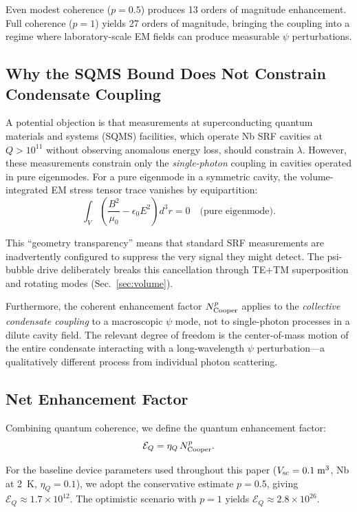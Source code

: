 \documentclass[twocolumn,prl,superscriptaddress,nofootinbib,longbibliography,floatfix]{revtex4-2}
\begin{document}
Even modest coherence ($p = 0.5$) produces 13 orders of magnitude
enhancement.  Full coherence ($p = 1$) yields 27 orders of magnitude,
bringing the coupling into a regime where laboratory-scale EM fields can
produce measurable $\psi$ perturbations.

\subsection{Why the SQMS Bound Does Not Constrain Condensate Coupling}

A potential objection is that measurements at superconducting quantum
materials and systems (SQMS) facilities, which operate Nb SRF cavities
at $Q > 10^{11}$ without observing anomalous energy loss, should
constrain $\lambda$.  However, these measurements constrain only the
\emph{single-photon} coupling in cavities operated in pure eigenmodes.
For a pure eigenmode in a symmetric cavity, the volume-integrated EM
stress tensor trace vanishes by equipartition:
\begin{equation}
\int_V \left(\frac{B^2}{\mu_0} - \epsilon_0 E^2\right) d^3r = 0
\quad \text{(pure eigenmode)}.
\label{eq:transparency}
\end{equation}

This ``geometry transparency'' means that standard SRF measurements are
inadvertently configured to suppress the very signal they might detect.
The psi-bubble drive deliberately breaks this cancellation through
TE+TM superposition and rotating modes (Sec.~\ref{sec:volume}).

Furthermore, the coherent enhancement factor
$N_{\rm Cooper}^p$ applies to the \emph{collective condensate coupling}
to a macroscopic $\psi$ mode, not to single-photon processes in a
dilute cavity field.  The relevant degree of freedom is the
center-of-mass motion of the entire condensate interacting with a
long-wavelength $\psi$ perturbation---a qualitatively different process
from individual photon scattering.

\subsection{Net Enhancement Factor}

Combining quantum coherence, we define the quantum enhancement factor:
\begin{equation}
\mathcal{E}_Q = \eta_Q\,N_{\rm Cooper}^p.
\label{eq:E-Q}
\end{equation}

For the baseline device parameters used throughout this paper
($V_{\rm sc} = 0.1\;\si{m^3}$, Nb at 2~K, $\eta_Q = 0.1$), we adopt
the conservative estimate $p = 0.5$, giving
$\mathcal{E}_Q \approx 1.7 \times 10^{12}$.  The optimistic scenario
with $p = 1$ yields $\mathcal{E}_Q \approx 2.8 \times 10^{26}$.
\end{document}
